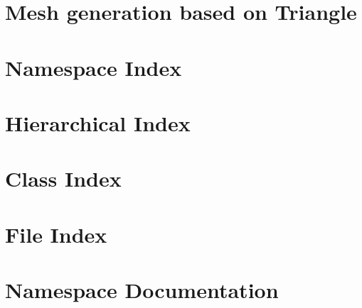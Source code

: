 \documentclass[twoside]{book}
\newcommand{\+}{\discretionary{\mbox{\scriptsize$\hookleftarrow$}}{}{}}
\begin{document}
  \raggedbottom
    \hypersetup{pageanchor=false,
                bookmarksnumbered=true,
                pdfencoding=unicode
               }
  \hypersetup{pageanchor=true}
\chapter{Mesh generation based on Triangle}
\label{index}\hypertarget{index}{}
\chapter{Namespace Index}

\chapter{Hierarchical Index}

\chapter{Class Index}

\chapter{File Index}

\chapter{Namespace Documentation}




\end{document}
